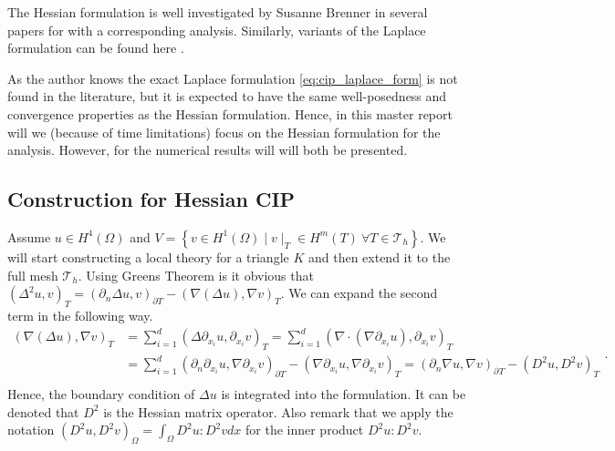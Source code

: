 \begin{enumerate}[label=\arabic*)]
\end{enumerate}


The Hessian formulation is well investigated by Susanne Brenner in several papers for \cite{brenner2012, brenner2012quadratic, brenner2012quadratic_kirk} with a corresponding analysis. Similarly, variants of the Laplace formulation can be found here
\cite{feng2007fully, georgoulis2009discontinuous}.

\begin{remark}

As the author knows the exact Laplace formulation \eqref{eq:cip_laplace_form} is not found in the literature, but it is expected to have the same well-posedness and convergence properties as the
Hessian formulation. Hence, in this master report will we (because of time limitations) focus on the Hessian formulation for the analysis. However, for the numerical results will will both be presented.
\end{remark}



\subsection{  Construction for Hessian CIP}%
\label{sub:continious_weak_form_of_biharmonic_equation}

Assume $u \in H^{4}( \Omega ) $ and $V = \left\{ v \in H^{1}( \Omega )  \mid  v \mid _{T} \in H^{m}( T) \ \forall T \in \mathcal{T} _{h}   \right\} $. We will start constructing a local theory for a triangle $K$ and then extend it to the full mesh
$\mathcal{T}_{h} $. Using Greens Theorem is it obvious that \(
\left( \Delta ^2 u,v \right) _{T }   = \left( \partial _{n} \Delta u, v \right) _{\partial T  } - \left( \nabla \left( \Delta  u \right) , \nabla v \right) _{T }
\).
We can expand the second term in the following way.
\begin{equation*}
    \begin{split}
( \nabla ( \Delta u ) , \nabla v ) _{T } & = \sum_{i = 1}^{ d}  ( \Delta  \partial _{x_{i}} u, \partial _{x_{i}}v ) _{T }  = \sum_{i = 1}^{d}  ( \nabla \cdot ( \nabla \partial _{x_{i}} u ) , \partial _{x_{i}} v )_{T }  \\
&= \sum_{i = 1}^{d}  ( \partial_n  \partial _{x_{i}} u, \nabla  \partial _{x_{i}} v ) _{\partial T } -   ( \nabla \partial _{x_{i}} u, \nabla \partial _{x_{i}} v )_{T }
= (  \partial_n\nabla u, \nabla v ) _{\partial_{} T  } - ( D^2 u, D^2v ) _{T } \\
    \end{split}
.\end{equation*}
Hence, the boundary condition of $\Delta u$ is integrated into the formulation.  It can be denoted that $D^2$ is the Hessian matrix operator. Also remark that we apply the notation
$( D^2u, D^2v )_{\Omega } = \int_{\Omega }^{} D^{2}u : D^2v  dx$ for the inner product $D^2u:D^2v$.

